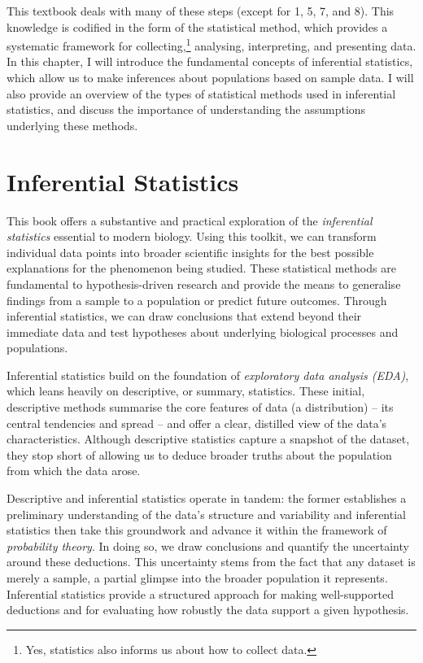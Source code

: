 \documentclass[
  letterpaper,
]{book}
\begin{document}
This textbook deals with many of these steps (except for 1, 5, 7, and
8). This knowledge is codified in the form of the statistical method,
which provides a systematic framework for collecting,\footnote{Yes,
  statistics also informs us about how to collect data.} analysing,
interpreting, and presenting data. In this chapter, I will introduce the
fundamental concepts of inferential statistics, which allow us to make
inferences about populations based on sample data. I will also provide
an overview of the types of statistical methods used in inferential
statistics, and discuss the importance of understanding the assumptions
underlying these methods.

\section{Inferential Statistics}\label{inferential-statistics}

This book offers a substantive and practical exploration of the
\emph{inferential statistics} essential to modern biology. Using this
toolkit, we can transform individual data points into broader scientific
insights for the best possible explanations for the phenomenon being
studied. These statistical methods are fundamental to hypothesis-driven
research and provide the means to generalise findings from a sample to a
population or predict future outcomes. Through inferential statistics,
we can draw conclusions that extend beyond their immediate data and test
hypotheses about underlying biological processes and populations.

Inferential statistics build on the foundation of \emph{exploratory data
analysis (EDA)}, which leans heavily on descriptive, or summary,
statistics. These initial, descriptive methods summarise the core
features of data (a distribution) -- its central tendencies and spread
-- and offer a clear, distilled view of the data's characteristics.
Although descriptive statistics capture a snapshot of the dataset, they
stop short of allowing us to deduce broader truths about the population
from which the data arose.

Descriptive and inferential statistics operate in tandem: the former
establishes a preliminary understanding of the data's structure and
variability and inferential statistics then take this groundwork and
advance it within the framework of \emph{probability theory}. In doing
so, we draw conclusions and quantify the uncertainty around these
deductions. This uncertainty stems from the fact that any dataset is
merely a sample, a partial glimpse into the broader population it
represents. Inferential statistics provide a structured approach for
making well-supported deductions and for evaluating how robustly the
data support a given hypothesis.
\end{document}
